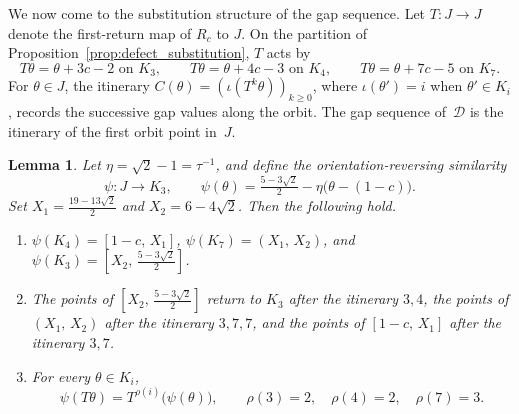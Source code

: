 \documentclass{birkjour}
\newtheorem{lemma}[theorem]{Lemma}
\theoremstyle{definition}
\theoremstyle{remark}
\begin{document}
We now come to the substitution structure of the gap
sequence. Let $T\colon J\to J$ denote the first-return map
of $R_{c}$ to $J$. On the partition of
Proposition~\ref{prop:defect_substitution}, $T$ acts by
\[
  T\theta=\theta+3c-2 \text{ on } K_{3},\qquad
  T\theta=\theta+4c-3 \text{ on } K_{4},\qquad
  T\theta=\theta+7c-5 \text{ on } K_{7}.
\]
For $\theta\in J$, the itinerary
$C(\theta)=(\iota(T^{k}\theta))_{k\ge 0}$, where
$\iota(\theta')=i$ when $\theta'\in K_{i}$, records the
successive gap values along the orbit. The gap sequence
of~$\mathcal{D}$ is the itinerary of the first orbit point
in~$J$.

\begin{lemma}\label{lem:selfind}
Let $\eta=\sqrt{2}-1=\tau^{-1}$, and define the
orientation-reversing similarity
\[
  \psi\colon J\to K_{3},\qquad
  \psi(\theta)=\tfrac{5-3\sqrt{2}}{2}
  -\eta\bigl(\theta-(1-c)\bigr).
\]
Set $X_{1}=\tfrac{19-13\sqrt{2}}{2}$ and
$X_{2}=6-4\sqrt{2}$. Then the following hold.
\begin{enumerate}
\item[\textup{(a)}] $\psi(K_{4})=[1{-}c,\,X_{1}]$,
$\psi(K_{7})=(X_{1},\,X_{2})$, and
$\psi(K_{3})=[X_{2},\,\tfrac{5-3\sqrt{2}}{2}]$.
\item[\textup{(b)}] The points of
$[X_{2},\,\tfrac{5-3\sqrt{2}}{2}]$ return to $K_{3}$ after
the itinerary $3,4$, the points of $(X_{1},\,X_{2})$ after
the itinerary $3,7,7$, and the points of $[1{-}c,\,X_{1}]$
after the itinerary $3,7$.
\item[\textup{(c)}] For every $\theta\in K_{i}$,
\[
  \psi(T\theta)=T^{\rho(i)}\bigl(\psi(\theta)\bigr),
  \qquad \rho(3)=2,\quad\rho(4)=2,\quad\rho(7)=3.
\]
\end{enumerate}
\end{lemma}
\end{document}
